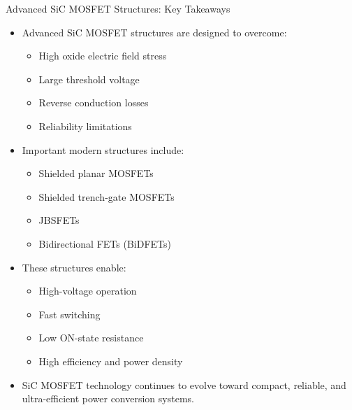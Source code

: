 \begin{frame}{Advanced SiC MOSFET Structures: Key Takeaways}
\begin{itemize}
    \item Advanced SiC MOSFET structures are designed to overcome:
    \begin{itemize}
        \item High oxide electric field stress
        \item Large threshold voltage
        \item Reverse conduction losses
        \item Reliability limitations
    \end{itemize}

    \item Important modern structures include:
    \begin{itemize}
        \item Shielded planar MOSFETs
        \item Shielded trench-gate MOSFETs
        \item JBSFETs
        \item Bidirectional FETs (BiDFETs)
    \end{itemize}

    \item These structures enable:
    \begin{itemize}
        \item High-voltage operation
        \item Fast switching
        \item Low ON-state resistance
        \item High efficiency and power density
    \end{itemize}

    \item SiC MOSFET technology continues to evolve toward compact, reliable, and ultra-efficient power conversion systems.
\end{itemize}
\end{frame}

